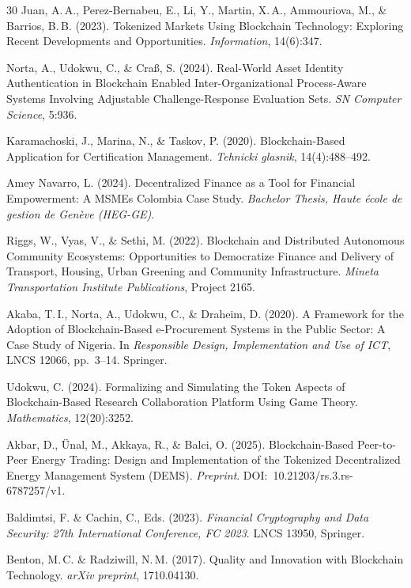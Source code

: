 \documentclass[11pt,a4paper]{article}
\begin{document}
\begin{thebibliography}{30}
Juan, A.\,A., Perez-Bernabeu, E., Li, Y., Martin, X.\,A., Ammouriova, M., \& Barrios, B.\,B. (2023).
\newblock Tokenized Markets Using Blockchain Technology: Exploring Recent Developments and Opportunities.
\newblock \textit{Information}, 14(6):347.

Norta, A., Udokwu, C., \& Cra{\ss}, S. (2024).
\newblock Real-World Asset Identity Authentication in Blockchain Enabled Inter-Organizational Process-Aware Systems Involving Adjustable Challenge-Response Evaluation Sets.
\newblock \textit{SN Computer Science}, 5:936.

Karamachoski, J., Marina, N., \& Taskov, P. (2020).
\newblock Blockchain-Based Application for Certification Management.
\newblock \textit{Tehnicki glasnik}, 14(4):488--492.

Amey Navarro, L. (2024).
\newblock Decentralized Finance as a Tool for Financial Empowerment: A MSMEs Colombia Case Study.
\newblock \textit{Bachelor Thesis, Haute \'ecole de gestion de Gen\`eve (HEG-GE)}.

Riggs, W., Vyas, V., \& Sethi, M. (2022).
\newblock Blockchain and Distributed Autonomous Community Ecosystems: Opportunities to Democratize Finance and Delivery of Transport, Housing, Urban Greening and Community Infrastructure.
\newblock \textit{Mineta Transportation Institute Publications}, Project 2165.

Akaba, T.\,I., Norta, A., Udokwu, C., \& Draheim, D. (2020).
\newblock A Framework for the Adoption of Blockchain-Based e-Procurement Systems in the Public Sector: A Case Study of Nigeria.
\newblock In \textit{Responsible Design, Implementation and Use of ICT}, LNCS 12066, pp.~3--14. Springer.

Udokwu, C. (2024).
\newblock Formalizing and Simulating the Token Aspects of Blockchain-Based Research Collaboration Platform Using Game Theory.
\newblock \textit{Mathematics}, 12(20):3252.

Akbar, D., \"Unal, M., Akkaya, R., \& Balci, O. (2025).
\newblock Blockchain-Based Peer-to-Peer Energy Trading: Design and Implementation of the Tokenized Decentralized Energy Management System (DEMS).
\newblock \textit{Preprint}. DOI:~10.21203/rs.3.rs-6787257/v1.

Baldimtsi, F. \& Cachin, C., Eds. (2023).
\newblock \textit{Financial Cryptography and Data Security: 27th International Conference, FC 2023}.
\newblock LNCS 13950, Springer.

Benton, M.\,C. \& Radziwill, N.\,M. (2017).
\newblock Quality and Innovation with Blockchain Technology.
\newblock \textit{arXiv preprint}, 1710.04130.

\end{thebibliography}
\end{document}
